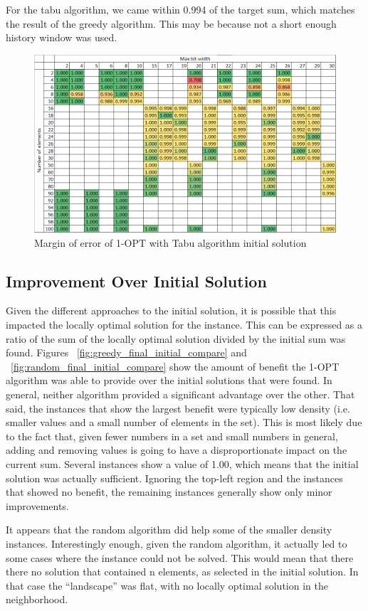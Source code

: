 \documentclass{report}
\begin{document}
For the tabu algorithm, we came within 0.994 of the target sum, which matches the result of the greedy algorithm. This
may be because not a short enough history window was used.

\begin{figure}[h]
  \centering
  \includegraphics[width=12cm]{p5_tabu_margin.png}
  \caption{Margin of error of 1-OPT with Tabu algorithm initial solution}
  \label{fig:tabu_opt_margin}
\end{figure}

\subsection{Improvement Over Initial Solution}
Given the different approaches to the initial solution, it is possible that this impacted
the locally optimal solution for the instance. This can be expressed as a ratio of the sum of
the locally optimal solution divided by the initial sum was found. Figures ~\ref{fig:greedy_final_initial_compare} and
~\ref{fig:random_final_initial_compare} show the amount of benefit the 1-OPT algorithm was able to
provide over the initial solutions that were found. In general, neither algorithm provided a significant advantage over
the other. That said, the instances that show the largest benefit were typically low density (i.e. smaller values
and a small number of elements in the set). This is most likely due to the fact that, given fewer numbers in a set and small
numbers in general, adding and removing values is going to have a disproportionate impact on the current sum. Several instances
show a value of 1.00, which means that the initial solution was actually sufficient. Ignoring the top-left region and the instances
that showed no benefit, the remaining instances generally show only minor improvements.

It appears that the random algorithm did help some of the smaller density instances. Interestingly enough, given
the random algorithm, it actually led to some cases where the instance could not be solved. This would mean
that there there no solution that contained n elements, as selected in the initial solution. In that case the ``landscape''
was flat, with no locally optimal solution in the neighborhood.
\end{document}
